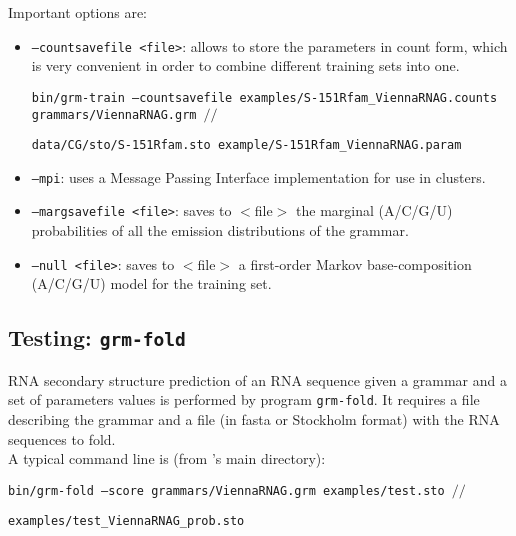 \noindent
Important options are:

\begin{itemize}

\item \texttt{--countsavefile <file>}: allows to store the
  parameters in count form, which is very convenient in order to
  combine different training sets into one.

\begin{footnotesize}
\texttt{bin/grm-train --countsavefile examples/S-151Rfam\_ViennaRNAG.counts grammars/ViennaRNAG.grm $//$}

\hspace{15mm}\texttt{data/CG/sto/S-151Rfam.sto example/S-151Rfam\_ViennaRNAG.param}\\
\end{footnotesize}

\item \texttt{--mpi}: uses a Message Passing Interface
  implementation for use in clusters.

\item \texttt{--margsavefile <file>}: saves to $<$file$>$ the
  marginal (A/C/G/U) probabilities of all the emission distributions
  of the grammar.

\item \texttt{--null <file>}: saves to $<$file$>$ a first-order
  Markov base-composition (A/C/G/U) model for the training set.

\end{itemize}

\subsection{Testing: \texttt{grm-fold}}

RNA secondary structure prediction of an RNA sequence given a grammar
and a set of parameters values is performed by program
\texttt{grm-fold}. It requires a file describing the grammar and a
file (in fasta or Stockholm format) with the RNA sequences to fold.\\


\noindent
A typical command line is (from \tornado's main directory):\\

\begin{footnotesize}
 \texttt{bin/grm-fold --score grammars/ViennaRNAG.grm examples/test.sto  $//$}

\hspace{15mm}\texttt{examples/test\_ViennaRNAG\_prob.sto}\\
\end{footnotesize}


